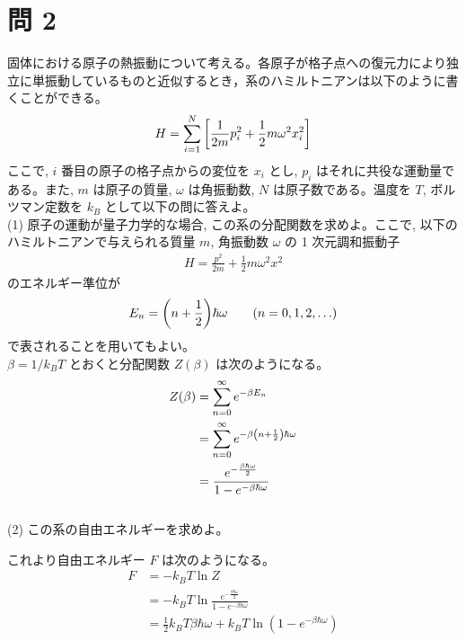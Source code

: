 \documentclass[a4paper,dvipdfmx]{jsarticle}
\theoremstyle{definition}
\begin{document}
\section*{問 2}
固体における原子の熱振動について考える。各原子が格子点への復元力により独立に単振動しているものと近似するとき，系のハミルトニアンは以下のように書くことができる。
\begin{align}
  H = \sum_{i=1}^{N}\qty[\frac{1}{2m}p_i^2 + \frac{1}{2}m\omega^2x_i^2]
\end{align}
ここで, $i$ 番目の原子の格子点からの変位を $x_i$ とし, $p_i$ はそれに共役な運動量である。また, $m$ は原子の質量, $\omega$ は角振動数, $N$ は原子数である。温度を $T$, ボルツマン定数を $k_B$ として以下の問に答えよ。 \\

(1) 原子の運動が量子力学的な場合, この系の分配関数を求めよ。ここで, 以下のハミルトニアンで与えられる質量 $m$, 角振動数 $\omega$ の 1 次元調和振動子
\begin{align}
  H = \frac{p^2}{2m} + \frac{1}{2}m\omega^2x^2
\end{align}
のエネルギー準位が
\begin{align}
  E_n = \qty(n + \frac{1}{2})\hbar\omega \qquad (n = 0, 1, 2, \ldots)
\end{align}
で表されることを用いてもよい。 \\

$\beta = 1/k_BT$ とおくと分配関数 $Z(\beta)$ は次のようになる。
\begin{align}
  Z(\beta) & = \sum_{n=0}^{\infty}e^{-\beta E_n}                                 \\
           & = \sum_{n=0}^{\infty}e^{-\beta\qty(n + \frac{1}{2})\hbar\omega}     \\
           & = \frac{e^{-\frac{\beta\hbar\omega}{2}}}{1 - e^{-\beta\hbar\omega}}
\end{align} \\

(2) この系の自由エネルギーを求めよ。

これより自由エネルギー $F$ は次のようになる。
\begin{align}
  F & = -k_BT\ln Z                                                                 \\
    & = -k_BT\ln \frac{e^{-\frac{\beta\hbar\omega}{2}}}{1 - e^{-\beta\hbar\omega}} \\
    & = \frac{1}{2}k_BT\beta\hbar\omega + k_BT\ln(1 - e^{-\beta\hbar\omega})
\end{align}
\end{document}
